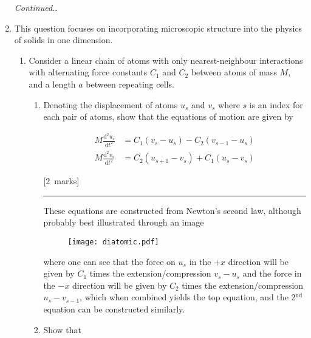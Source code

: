 \documentclass[12pt,a4paper]{article}
\newcommand{\sepline}[0]{\par \hfil\rule{10cm}{0.4pt} \vspace*{\parskip}\hfil}
\begin{document}
\begin{enumerate}
\begin{enumerate}
				\end{enumerate}

			\vfill \textit{Continued\ldots} \newpage


			\item This question focuses on incorporating microscopic structure into the physics of solids in one dimension.
				\begin{enumerate}
					\item Consider a linear chain of atoms with only nearest-neighbour interactions with alternating force constants $C_1$ and $C_2$ between atoms of mass $M$, and a length $a$ between repeating cells.

					\begin{enumerate}
						\item Denoting the displacement of atoms $u_s$ and $v_s$ where $s$ is an index for each pair of atoms, show that the equations of motion are given by

						\begin{align*}
							M \frac{\mathrm{d}^2 u_s}{\mathrm{d} t^2} & = C_1 (v_s - u_s) - C_2 (v_{s-1} - u_s) \\
							M \frac{\mathrm{d}^2 v_s}{\mathrm{d} t^2} & = C_2 (u_{s+1} - v_s) + C_1 (u_s - v_s)
						\end{align*}

						\hfill{[2~marks]}

						\begin{answer}

							\sepline

							These equations are constructed from Newton's second law, although probably best illustrated through an image

							\begin{figure}[h]
								\centering
								\texttt{[image: diatomic.pdf]}
							\end{figure}

							where one can see that the force on $u_s$ in the $+x$ direction will be given by $C_1$ times the extension/compression $v_s - u_s$ and the force in the $-x$ direction will be given by $C_2$ times the extension/compression $u_s - v_{s-1}$, which when combined yields the top equation, and the 2$^\textrm{nd}$ equation can be constructed similarly.

						\end{answer}

						\item Show that


\end{enumerate}
\end{enumerate}
\end{enumerate}
\end{document}
